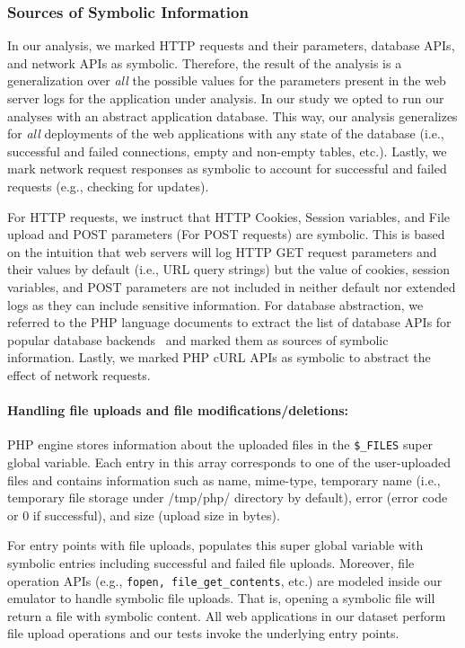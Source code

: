 \subsubsection{Sources of Symbolic Information} 

In our analysis, we marked HTTP requests and their parameters, database APIs, and network APIs as symbolic. 
Therefore, the result of the analysis is a generalization over \emph{all} the possible values for the parameters present in the web server logs for the application under analysis. 
In our study we opted to run our analyses with an abstract application database. 
This way, our analysis generalizes for \emph{all} deployments of the web applications with any state of the database (i.e., successful and failed connections, empty and non-empty tables, etc.). 
Lastly, we mark network request responses as symbolic to account for successful and failed requests (e.g., checking for updates).

For HTTP requests, we instruct \animatedead{} that HTTP Cookies, Session variables, and File upload and POST parameters (For POST requests) are symbolic. 
This is based on the intuition that web servers will log HTTP GET request parameters and their values by default (i.e., URL query strings) but the value of cookies, session variables, and POST parameters are not included in neither default nor extended logs as they can include sensitive information. 
For database abstraction, we referred to the PHP language documents to extract the list of database APIs for popular database backends~\cite{phpdatabaseapis} and marked them as sources of symbolic information. 
Lastly, we marked PHP cURL APIs as symbolic to abstract the effect of network requests. 

\paragraph{Handling file uploads and file modifications/deletions:} 
PHP engine stores information about the uploaded files in the \texttt{\$\_FILES} super global variable. 
Each entry in this array corresponds to one of the user-uploaded files and contains information such as name, mime-type, temporary name (i.e., temporary file storage under /tmp/php/ directory by default), error (error code or 0 if successful), and size (upload size in bytes). 

For entry points with file uploads, \animatedead{} populates this super global variable with symbolic entries including successful and failed file uploads. 
Moreover, file operation APIs (e.g., \texttt{fopen, file\_get\_contents}, etc.) are modeled inside our emulator to handle symbolic file uploads. 
That is, opening a symbolic file will return a file with symbolic content. 
All web applications in our dataset perform file upload operations and our tests invoke the underlying entry points. 

